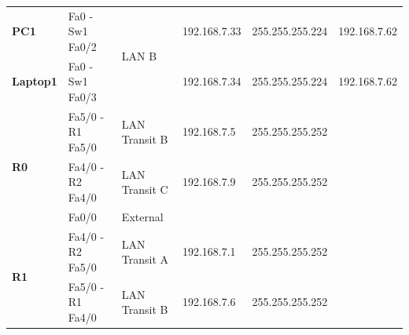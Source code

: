 \documentclass[11pt,a4paper]{report}
\begin{document}
\begin{center}
\begin{longtable}{@{}llllll@{}}
\textbf{PC1}                                       & Fa0 - Sw1 Fa0/2                                          & \multirow{2}{*}{LAN B}                                & 192.168.7.33                                     & 255.255.255.224                                           & 192.168.7.62                                          \\
\textbf{Laptop1}                                   & Fa0 - Sw1 Fa0/3                                          &                                                       & 192.168.7.34                                     & 255.255.255.224                                           & 192.168.7.62                                          \\* \midrule
\multirow{3}{*}{\textbf{R0}}                       & Fa5/0 - R1 Fa5/0                                         & LAN Transit B                                         & 192.168.7.5                                      & 255.255.255.252                                           &                                                       \\
                                                   & Fa4/0 - R2 Fa4/0                                         & LAN Transit C                                         & 192.168.7.9                                      & 255.255.255.252                                           &                                                       \\
                                                   & Fa0/0                                                    & External                                              &                                                  &                                                           &                                                       \\* \midrule
\multirow{4}{*}{\textbf{R1}}                       & Fa4/0 - R2 Fa5/0                                         & LAN Transit A                                         & 192.168.7.1                                      & 255.255.255.252                                           &                                                       \\
                                                   & Fa5/0 - R1 Fa4/0                                         & LAN Transit B                                         & 192.168.7.6                                      & 255.255.255.252                                           &                                                       \\

\end{longtable}
\end{center}
\end{document}
